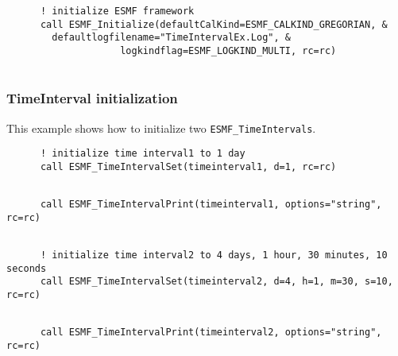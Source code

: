 
 \begin{verbatim}
      ! initialize ESMF framework
      call ESMF_Initialize(defaultCalKind=ESMF_CALKIND_GREGORIAN, &
        defaultlogfilename="TimeIntervalEx.Log", &
                    logkindflag=ESMF_LOGKIND_MULTI, rc=rc)
 
\end{verbatim}
 

  \subsubsection{TimeInterval initialization}
 
   This example shows how to initialize two {\tt ESMF\_TimeIntervals}. 

 \begin{verbatim}
      ! initialize time interval1 to 1 day
      call ESMF_TimeIntervalSet(timeinterval1, d=1, rc=rc)
 
\end{verbatim}
 

 \begin{verbatim}
      call ESMF_TimeIntervalPrint(timeinterval1, options="string", rc=rc)
 
\end{verbatim}
 

 \begin{verbatim}
      ! initialize time interval2 to 4 days, 1 hour, 30 minutes, 10 seconds
      call ESMF_TimeIntervalSet(timeinterval2, d=4, h=1, m=30, s=10, rc=rc)
 
\end{verbatim}
 

 \begin{verbatim}
      call ESMF_TimeIntervalPrint(timeinterval2, options="string", rc=rc)
 
\end{verbatim}
 

